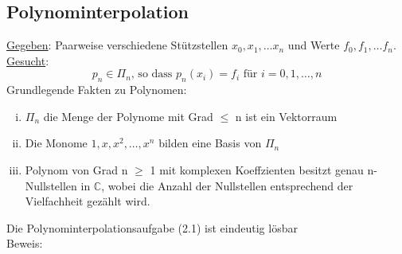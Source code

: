 \subsection{Polynominterpolation}
\underline{Gegeben}: Paarweise verschiedene Stützstellen $x_0, x_1, \ldots x_n$ und
Werte $f_0, f_1, \ldots f_n$.\\
\underline{Gesucht}:
\begin{equation*}
  \tag{2.1} p_n \in  \Pi_n \text{, so dass } p_n(x_i) = 
  f_i \text{ für } i = 0, 1, \ldots ,n
\end{equation*}
Grundlegende Fakten zu Polynomen:
\begin{enumerate}[(i)]
  \item $\Pi_n$ die Menge der Polynome mit Grad $\leq$ n ist ein Vektorraum
  \item Die Monome $1, x, x^2, \ldots, x^n$ bilden eine Basis von $\Pi_n$
  \item Polynom von Grad n $\geq$ 1 mit komplexen Koeffzienten besitzt genau n-Nullstellen
    in $\mathbb{C}$, wobei die Anzahl der Nullstellen entsprechend der Vielfachheit
    gezählt wird.
\end{enumerate}
 Die Polynominterpolationsaufgabe (2.1) ist eindeutig lösbar\\
Beweis:
